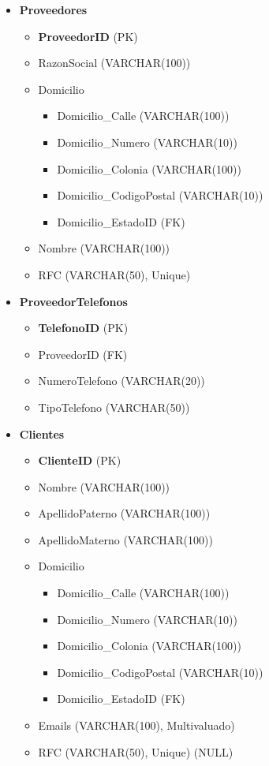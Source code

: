 \documentclass[10pt,openany]{book}
\begin{document}
\begin{itemize}
    \item \textbf{Proveedores}
        \begin{itemize}
            \item \textbf{ProveedorID} (PK)
            \item RazonSocial (VARCHAR(100))
            \item Domicilio
            \begin{itemize}
                \item Domicilio\_Calle (VARCHAR(100))
                \item Domicilio\_Numero (VARCHAR(10))
                \item Domicilio\_Colonia (VARCHAR(100))
                \item Domicilio\_CodigoPostal (VARCHAR(10))
                \item Domicilio\_EstadoID (FK)
            \end{itemize}
            \item Nombre (VARCHAR(100))
            \item RFC (VARCHAR(50), Unique)
        \end{itemize}
        
    \item \textbf{ProveedorTelefonos}
        \begin{itemize}
            \item \textbf{TelefonoID} (PK)
            \item ProveedorID (FK)
            \item NumeroTelefono (VARCHAR(20))
            \item TipoTelefono (VARCHAR(50)) %
        \end{itemize}
        
    \item \textbf{Clientes}
        \begin{itemize}
            \item \textbf{ClienteID} (PK)
            \item Nombre (VARCHAR(100))
            \item ApellidoPaterno (VARCHAR(100))
            \item ApellidoMaterno (VARCHAR(100))
            \item Domicilio
            \begin{itemize}
                \item Domicilio\_Calle (VARCHAR(100))
                \item Domicilio\_Numero (VARCHAR(10))
                \item Domicilio\_Colonia (VARCHAR(100))
                \item Domicilio\_CodigoPostal (VARCHAR(10))
                \item Domicilio\_EstadoID (FK)
            \end{itemize}
            \item Emails (VARCHAR(100), Multivaluado)
            \item RFC (VARCHAR(50), Unique) (NULL)
        \end{itemize}
        

\end{itemize}
\end{document}
